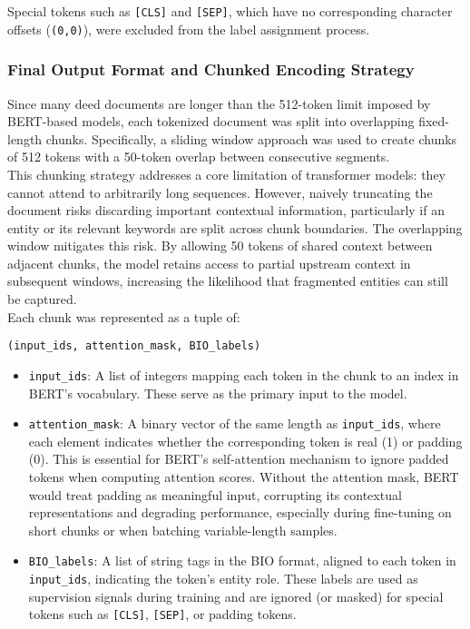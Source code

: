 \documentclass{article}
\begin{document}
Special tokens such as \texttt{[CLS]} and \texttt{[SEP]}, which have no corresponding character offsets (\texttt{(0,0)}), were excluded from the label assignment process.


\subsubsection{Final Output Format and Chunked Encoding Strategy}

Since many deed documents are longer than the 512-token limit imposed by BERT-based models, each tokenized document was split into overlapping fixed-length chunks. Specifically, a sliding window approach was used to create chunks of 512 tokens with a 50-token overlap between consecutive segments. \cite {wolf2020transformers}\\

This chunking strategy addresses a core limitation of transformer models: they cannot attend to arbitrarily long sequences. However, naively truncating the document risks discarding important contextual information, particularly if an entity or its relevant keywords are split across chunk boundaries. The overlapping window mitigates this risk. By allowing 50 tokens of shared context between adjacent chunks, the model retains access to partial upstream context in subsequent windows, increasing the likelihood that fragmented entities can still be captured. \\

Each chunk was represented as a tuple of:
\begin{verbatim}
(input_ids, attention_mask, BIO_labels)
\end{verbatim}

\begin{itemize}
    \item \texttt{input\_ids}: A list of integers mapping each token in the chunk to an index in BERT’s vocabulary. These serve as the primary input to the model.
    
    \item \texttt{attention\_mask}: A binary vector of the same length as \texttt{input\_ids}, where each element indicates whether the corresponding token is real (1) or padding (0). This is essential for BERT's self-attention mechanism to ignore padded tokens when computing attention scores. Without the attention mask, BERT would treat padding as meaningful input, corrupting its contextual representations and degrading performance, especially during fine-tuning on short chunks or when batching variable-length samples.

    \item \texttt{BIO\_labels}: A list of string tags in the BIO format, aligned to each token in \texttt{input\_ids}, indicating the token’s entity role. These labels are used as supervision signals during training and are ignored (or masked) for special tokens such as \texttt{[CLS]}, \texttt{[SEP]}, or padding tokens.
\end{itemize}
\end{document}
